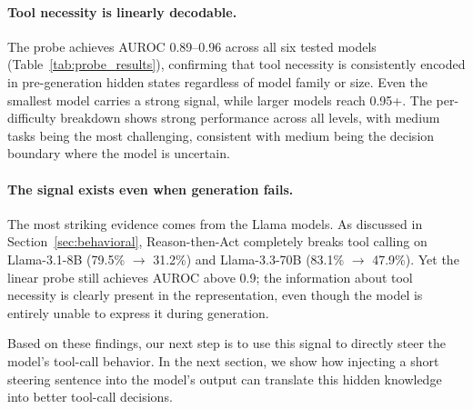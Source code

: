\paragraph{Tool necessity is linearly decodable.}
The probe achieves AUROC 0.89--0.96 across all six tested models (Table~\ref{tab:probe_results}), confirming that tool necessity is consistently encoded in pre-generation hidden states regardless of model family or size. Even the smallest model carries a strong signal, while larger models reach 0.95+. The per-difficulty breakdown shows strong performance across all levels, with medium tasks being the most challenging, consistent with medium being the decision boundary where the model is uncertain.
\vspace{-5pt}
\paragraph{The signal exists even when generation fails.}
The most striking evidence comes from the Llama models. As discussed in Section~\ref{sec:behavioral}, Reason-then-Act completely breaks tool calling on Llama-3.1-8B (79.5\% $\to$ 31.2\%) and Llama-3.3-70B (83.1\% $\to$ 47.9\%). Yet the linear probe still achieves AUROC above 0.9; the information about tool necessity is clearly present in the representation, even though the model is entirely unable to express it during generation. 

Based on these findings, our next step is to use this signal to directly steer the model's tool-call behavior. In the next section, we show how injecting a short steering sentence into the model's output can translate this hidden knowledge into better tool-call decisions.
